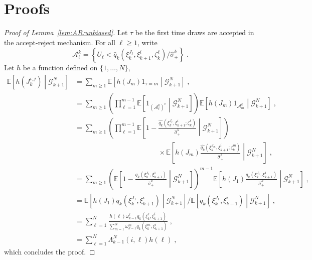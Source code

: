 \documentclass[12pt]{article}
\newcommand{\eqsp}{\;}
\newcommand{\1}{\mathrm{1}}
\begin{document}
\section{Proofs}
\label{sec:append:proofs}
\begin{proof}[Proof of Lemma~\ref{lem:AR:unbiased}]
Let $\tau$ be the first time  draws are accepted in the accept-reject mechanism. For all $\ell\ge 1$, write
\[
\mathcal{A}^k_{\ell} = \left\{U_\ell<\widehat{q}_{k}(\xi_{k}^{J_\ell},\xi_{k+1}^{i},\zeta^{\ell}_{k})/\hat{\sigma}^k_+\right\}\eqsp.
\]
Let $h$ be a function defined on $\{1,\ldots,N\}$,
\begin{align*}
\mathbb{E}\left[h(J^{i,j}_k)\middle| \mathcal{G}_{k+1}^N\right] & = \sum_{m\ge 1}\mathbb{E}\left[h(J_m)\1_{\tau=m}\middle| \mathcal{G}_{k+1}^N\right]\eqsp,\\
& = \sum_{m\ge 1}\left(\prod_{\ell=1}^{m-1}\mathbb{E}\left[\1_{(\mathcal{A}^k_{\ell})^c}\middle| \mathcal{G}_{k+1}^N\right]\right)\mathbb{E}\left[h(J_m)\1_{\mathcal{A}^k_{m}}\middle| \mathcal{G}_{k+1}^N\right]\eqsp,\\
& = \sum_{m\ge 1}\left(\prod_{\ell=1}^{m-1}\mathbb{E}\left[1-\frac{\widehat{q_k}(\xi_{k}^{J_\ell},\xi_{k+1}^{i};\zeta_k^{\ell})}{\hat{\sigma}^k_{+}}\middle| \mathcal{G}_{k+1}^N\right]\right)\\
&\hspace{5cm}\times\mathbb{E}\left[h(J_m)\frac{\widehat{q_k}(\xi_{k}^{J_m},\xi_{k+1}^{i};\zeta_k^{m})}{\hat{\sigma}^k_{+}}\middle| \mathcal{G}_{k+1}^N\right]\eqsp,\\
& = \sum_{m\ge 1}\left(\mathbb{E}\left[1-\frac{q_k(\xi_{k}^{J_1},\xi_{k+1}^{1})}{\hat{\sigma}^k_{+}}\middle| \mathcal{G}_{k+1}^N\right]\right)^{m-1}\mathbb{E}\left[h(J_1)\frac{q_k(\xi_{k}^{J_1},\xi_{k+1}^{1})}{\hat{\sigma}^k_{+}}\middle| \mathcal{G}_{k+1}^N\right]\eqsp,\\
& = \mathbb{E}\left[h(J_1)q_k(\xi_{k}^{J_1},\xi_{k+1}^{i})\middle| \mathcal{G}_{k+1}^N\right]/\mathbb{E}\left[q_k(\xi_{k}^{J_1},\xi_{k+1}^{i})\middle| \mathcal{G}_{k+1}^N\right]\eqsp,\\
& = \sum_{\ell=1}^N \frac{h(\ell)\omega_{k-1}^{\ell}q_k(\xi_{k}^{\ell},\xi_{k+1}^{i})}{\sum_{m=1}^N\omega_{k-1}^{m}q_k(\xi_{k}^{m},\xi_{k+1}^{i})}\eqsp,\\
&= \sum_{\ell=1}^N \Lambda_{k-1}^N(i,\ell)h(\ell) \eqsp,
\end{align*}
which concludes the proof.
\end{proof}
\end{document}
